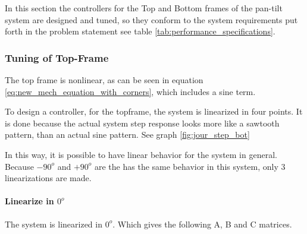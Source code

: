 \documentclass[../../../Main]{subfiles}
\begin{document}
\label{sec:PI}
In this section the controllers for the Top and Bottom frames of the pan-tilt system are designed and tuned, so they conform to the system requirements put forth in the problem statement see table \ref{tab:performance_specifications}.

\subsubsection{Tuning of Top-Frame}
\label{sec:top_frame_tuning}
The top frame is nonlinear, as can be seen in equation \eqref{eq:new_mech_equation_with_corners}, which includes a sine term.

To design a controller, for the topframe, the system is linearized in four points. It is done because the actual system step response looks more like a sawtooth pattern, than an actual sine pattern. See graph \ref{fig:jour_step_bot}

In this way, it is possible to have linear behavior for the system in general.
Because $-90^o$ and  $+90^o$ are the has the same behavior in this system, only 3 linearizations are made.

\paragraph{Linearize in $0^o$}
\label{sec:linearize}
The system is linearized in $0^o$. Which gives the following A, B and C matrices.
\end{document}

